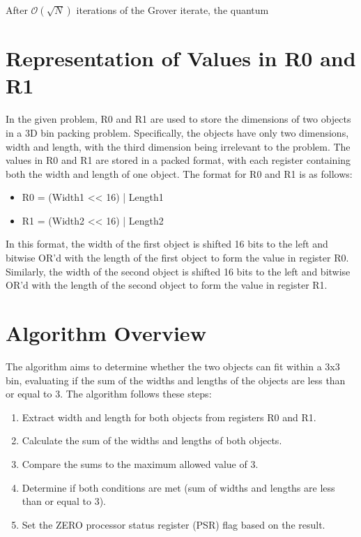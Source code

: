 After $\mathcal{O}(\sqrt{N})$ iterations of the Grover iterate, the quantum

\section{Representation of Values in R0 and R1}

In the given problem, R0 and R1 are used to store the dimensions of two objects in a 3D bin packing problem. Specifically, the objects have only two dimensions, width and length, with the third dimension being irrelevant to the problem. The values in R0 and R1 are stored in a packed format, with each register containing both the width and length of one object. The format for R0 and R1 is as follows:

\begin{itemize}
\item R0 = (Width1 << 16) | Length1
\item R1 = (Width2 << 16) | Length2
\end{itemize}

In this format, the width of the first object is shifted 16 bits to the left and bitwise OR'd with the length of the first object to form the value in register R0. Similarly, the width of the second object is shifted 16 bits to the left and bitwise OR'd with the length of the second object to form the value in register R1.

\section{Algorithm Overview}

The algorithm aims to determine whether the two objects can fit within a 3x3 bin, evaluating if the sum of the widths and lengths of the objects are less than or equal to 3. The algorithm follows these steps:

\begin{enumerate}
\item Extract width and length for both objects from registers R0 and R1.
\item Calculate the sum of the widths and lengths of both objects.
\item Compare the sums to the maximum allowed value of 3.
\item Determine if both conditions are met (sum of widths and lengths are less than or equal to 3).
\item Set the ZERO processor status register (PSR) flag based on the result.
\end{enumerate}


